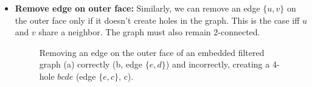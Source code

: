 \begin{itemize}
	\item \textbf{Remove edge on outer face:} Similarly, we can remove an edge $\{u, v\}$ on the outer face only if it doesn't create holes in the graph. This is the case iff $u$ and $v$ share a neighbor. The graph must also remain 2-connected.
\begin{figure}[H]
	\centering
	\quad
	\quad
	\caption{Removing an edge on the outer face of an embedded filtered graph (a) correctly (b, edge $\{e,d\}$) and incorrectly, creating a 4-hole $bcde$ (edge $\{e,c\}$, c).}
	\label{fig:transformation}
\end{figure}
\end{itemize}
